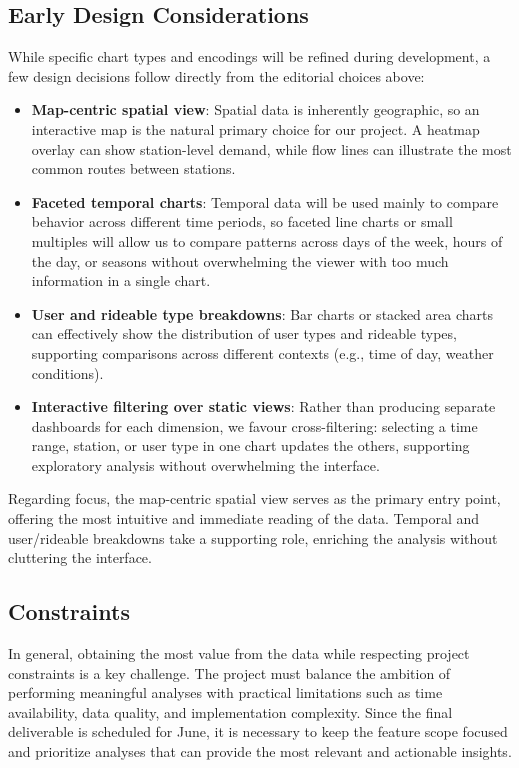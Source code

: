\subsection{Early Design Considerations}
While specific chart types and encodings will be refined during development, a few design decisions follow directly from the editorial choices above:
\begin{itemize}
  \item \textbf{Map-centric spatial view}: Spatial data is inherently geographic, so an interactive map is the natural primary choice for our project.
  A heatmap overlay can show station-level demand, while flow lines can illustrate the most common routes between stations.
  \item \textbf{Faceted temporal charts}: Temporal data will be used mainly to compare behavior across different time periods, so faceted line charts or 
  small multiples will allow us to compare patterns across days of the week, hours of the day, or seasons without overwhelming the viewer with too much information in a single chart.
  \item \textbf{User and rideable type breakdowns}: Bar charts or stacked area charts can effectively show the distribution of user types and rideable types, supporting comparisons across different contexts (e.g., time of day, weather conditions).
  \item \textbf{Interactive filtering over static views}: Rather than producing separate dashboards for each dimension, we favour cross-filtering: selecting a time range, station, or user type in one chart updates the others, supporting exploratory analysis without overwhelming the interface.
\end{itemize}
Regarding focus, the map-centric spatial view serves as the primary entry point, offering the most intuitive and immediate reading of the data.
Temporal and user/rideable breakdowns take a supporting role, enriching the analysis without cluttering the interface.

\subsection{Constraints}
In general, obtaining the most value from the data while respecting project constraints is a key challenge.
The project must balance the ambition of performing meaningful analyses with practical limitations such as time availability, data quality, and implementation complexity. 
Since the final deliverable is scheduled for June, it is necessary to keep the feature scope focused and prioritize analyses that can provide the most relevant and actionable insights.

